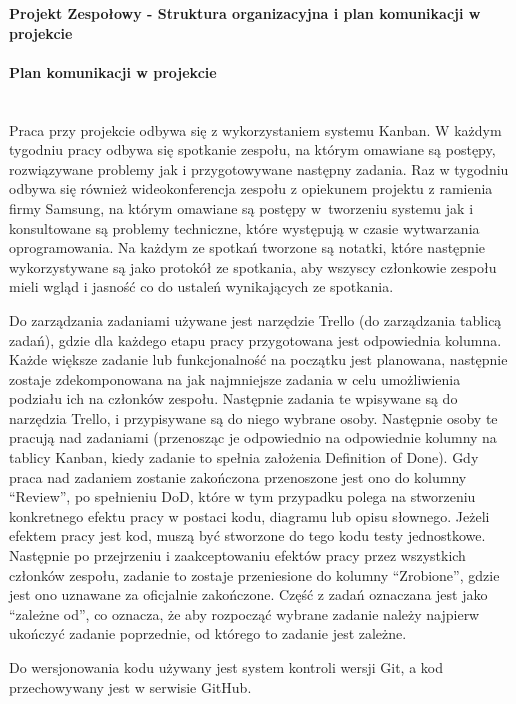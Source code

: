 \documentclass{article}
\begin{document}
\begin{center}
\textbf{Projekt Zespołowy - Struktura organizacyjna i plan komunikacji w projekcie}
\end{center}

\paragraph{Plan komunikacji w projekcie}\mbox{}\\

Praca przy projekcie odbywa się z wykorzystaniem systemu Kanban. W każdym tygodniu pracy odbywa się spotkanie zespołu, na którym omawiane są postępy, rozwiązywane problemy jak i przygotowywane następny zadania. Raz w tygodniu odbywa się również wideokonferencja zespołu z opiekunem projektu z ramienia firmy Samsung, na którym omawiane są postępy w~tworzeniu systemu jak i konsultowane są problemy techniczne, które występują w czasie wytwarzania oprogramowania. 
Na każdym ze spotkań tworzone są notatki, które następnie wykorzystywane są jako protokół ze spotkania, aby wszyscy członkowie zespołu mieli wgląd i jasność co do ustaleń wynikających ze spotkania. 

Do zarządzania zadaniami \nobreak używane jest narzędzie Trello (do zarządzania tablicą zadań), gdzie dla każdego etapu pracy przygotowana jest \nobreak odpowiednia kolumna. Każde większe zadanie lub funkcjonalność na początku jest planowana, następnie zostaje zdekomponowana na jak najmniejsze zadania w celu umożliwienia podziału ich na członków zespołu. \nobreak Następnie zadania te wpisywane są do narzędzia Trello, i przypisywane są do niego wybrane osoby. Następnie osoby te pracują nad zadaniami (przenosząc je odpowiednio na odpowiednie kolumny na tablicy Kanban, kiedy zadanie to spełnia założenia Definition of Done). Gdy praca nad zadaniem zostanie zakończona przenoszone jest ono do kolumny “Review”, po spełnieniu DoD, które w tym przypadku polega na stworzeniu konkretnego efektu pracy w postaci kodu, diagramu lub opisu słownego. Jeżeli efektem pracy jest kod, muszą być stworzone do tego kodu testy jednostkowe. Następnie po przejrzeniu i zaakceptowaniu efektów pracy przez wszystkich członków zespołu, zadanie to zostaje przeniesione do kolumny “Zrobione”, gdzie jest ono uznawane za oficjalnie zakończone. Część z zadań oznaczana jest jako “zależne od”, co oznacza, że aby rozpocząć wybrane zadanie należy najpierw ukończyć zadanie poprzednie, od którego to zadanie jest zależne. 

Do wersjonowania kodu używany jest system kontroli wersji Git, a kod przechowywany jest w serwisie GitHub.
\end{document}

